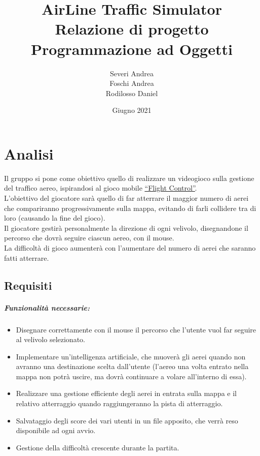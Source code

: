 \documentclass[a4paper,12pt]{report}
\title{
\textbf{AirLine Traffic Simulator}
\\Relazione di progetto
\\Programmazione ad Oggetti
}
\date{Giugno 2021}
\author{
Severi Andrea
\\Foschi Andrea
\\Rodilosso Daniel
}
\begin{document}
\maketitle

\tableofcontents

\chapter{Analisi}
Il gruppo si pone come obiettivo quello di realizzare un videogioco sulla gestione del traffico aereo, ispirandosi al gioco mobile \href{https://youtu.be/KTH084KeFBc}{\underline{“Flight Control”}}.
\\
L’obiettivo del giocatore sarà quello di far atterrare il maggior numero di aerei che compariranno progressivamente sulla mappa, evitando di farli collidere tra di loro (causando la fine del gioco).
\\
Il giocatore gestirà personalmente la direzione di ogni velivolo, disegnandone il percorso che dovrà seguire ciascun aereo, con il mouse.
\\
La difficoltà di gioco aumenterà con l’aumentare del numero di aerei che saranno fatti atterrare.

\section{Requisiti}

\paragraph{Funzionalità necessarie:}

\begin{itemize}
    \item Disegnare correttamente con il mouse il percorso che l’utente vuol far seguire al velivolo selezionato.
    
    \item Implementare un’intelligenza artificiale, che muoverà gli aerei quando non avranno una destinazione scelta dall’utente (l’aereo una volta entrato nella mappa non potrà uscire, ma dovrà continuare a volare all’interno di essa).
    
    \item Realizzare una gestione efficiente degli aerei in entrata sulla mappa e il relativo atterraggio quando raggiungeranno la pista di atterraggio.
    
    \item Salvataggio degli score dei vari utenti in un file apposito, che verrà reso disponibile ad ogni avvio.
    
    \item Gestione della difficoltà crescente durante la partita.
\end{itemize}
\end{document}
